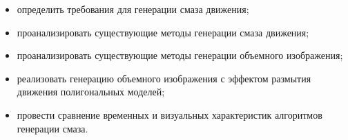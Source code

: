 \begin{itemize}
    \item определить требования для генерации смаза движения;
    \item проанализировать существующие методы генерации смаза движения;
    \item проанализировать существующие методы генерации объемного изображения;
    \item реализовать генерацию объемного изображения с эффектом размытия движения полигональных моделей;
    \item провести сравнение временных и визуальных характеристик алгоритмов генерации смаза.
\end{itemize}






